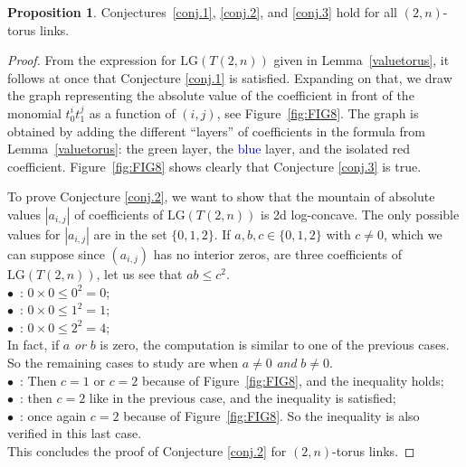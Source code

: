 \documentclass[12pt,reqno]{amsart}
\theoremstyle{definition}
\newtheorem{proposition}[theorem]{Proposition}
\def\red#1{\textcolor{red}{#1}}
\def\blue#1{\textcolor{blue}{#1}}
\def\green#1{\textcolor{green}{#1}}
\def\red#1{\textcolor[rgb]{1.00,0.00,0.00}{#1}}
\def\green#1{\textcolor[rgb]{0.00,0.70,0.30}{#1}}
\def\LG{\mathrm{LG}}
\begin{document}
\begin{proposition}
Conjectures~\ref{conj.1}, \ref{conj.2}, and \ref{conj.3} hold for all \texorpdfstring{$(2,n)$}{(2,n)}-torus links.
\end{proposition}

\begin{proof}
    From the expression for $\LG(T(2,n))$ given in Lemma~\ref{valuetorus}, it follows at once that Conjecture \ref{conj.1} is satisfied. Expanding on that, we draw the graph representing the absolute value of the coefficient in front of the monomial $t_0^i t_1^j$ as a function of $(i,j)$, see Figure~\ref{fig:FIG8}. The graph is obtained by adding the different ``layers'' of coefficients in the formula from Lemma~\ref{valuetorus}: the \green{green} layer, the \blue{blue} layer, and the isolated \red{red} coefficient. Figure~\ref{fig:FIG8} shows clearly that Conjecture \ref{conj.3} is true.

    To prove Conjecture \ref{conj.2}, we want to show that the mountain of absolute values $|a_{i,j}|$ of coefficients of $\LG(T(2,n))$ is 2d log-concave. The only possible values for $|a_{i,j}|$ are in the set $\{0,1,2\}$. If $a,b,c \in \{0,1,2\}$ with $c \neq 0$, which we can suppose since $(a_{i,j})$ has no interior zeros, are three coefficients of $\LG(T(2,n))$, let us see that $ab \leq c^2$. \\
$\bullet$ \,:  $0 \times 0 \leq 0^2 = 0$;\\
$\bullet$ \,:   $0 \times 0 \leq 1^2 = 1$;\\
$\bullet$ \,:   $0 \times 0 \leq 2^2 = 4$;\\
In fact, if $a$ \textit{or} $b$ is zero, the computation is similar to one of the previous cases. So the remaining cases to study are when $a \neq 0$ \textit{and} $b \neq 0$. \\
$\bullet$ \,:   Then $c = 1$ or $c = 2$ because of Figure~\ref{fig:FIG8}, and the inequality holds;\\
$\bullet$ \,: then $c = 2$ like in the previous case, and the inequality is \mbox{satisfied;}\\
$\bullet$ \,:  once again $c = 2$ because of Figure~\ref{fig:FIG8}. So the inequality is also verified in this last case. \\

This concludes the proof of Conjecture \ref{conj.2} for \texorpdfstring{$(2,n)$}{(2,n)}-torus links.
\end{proof}
\end{document}
